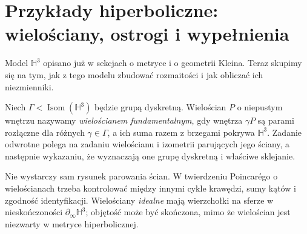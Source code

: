 \section{Przykłady hiperboliczne: wielościany, ostrogi i wypełnienia}
\label{sec:thur-dop-hiperboliczne}
Model $\mathbb H^3$ opisano już w sekcjach o metryce i o
geometrii Kleina. Teraz skupimy się na tym, jak z tego modelu
zbudować rozmaitości i jak obliczać ich niezmienniki.

\begin{definicja}
\label{def:thur-dop-wieloscian}
Niech $\Gamma<\operatorname{Isom}(\mathbb H^3)$ będzie grupą
dyskretną. Wielościan $P$ o niepustym wnętrzu nazywamy
\emph{wielościanem fundamentalnym}, gdy wnętrza $\gamma P$
są parami rozłączne dla różnych $\gamma\in\Gamma$,
a ich suma razem z brzegami pokrywa $\mathbb H^3$.
Zadanie odwrotne polega na zadaniu wielościanu i izometrii
parujących jego ściany, a następnie wykazaniu, że wyznaczają
one grupę dyskretną i właściwe sklejanie.
\end{definicja}

Nie wystarczy sam rysunek parowania ścian. W twierdzeniu
Poincarégo o wielościanach trzeba kontrolować między innymi
cykle krawędzi, sumy kątów i zgodność identyfikacji.
Wielościany \emph{idealne} mają wierzchołki na sferze
w nieskończoności $\partial_\infty\mathbb H^3$;
objętość może być skończona, mimo że wielościan
jest niezwarty w metryce hiperbolicznej.

